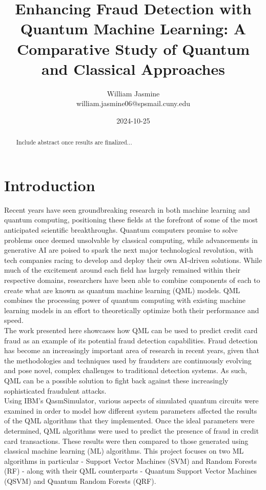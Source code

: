 \documentclass[11pt, oneside]{article}   	%
\title{Enhancing Fraud Detection with Quantum Machine Learning: A Comparative Study of Quantum and Classical Approaches}
\author{William Jasmine \\william.jasmine06@spsmail.cuny.edu}
\date{2024-10-25}							%
\begin{document}
\maketitle

\begin{abstract}
Include abstract once results are finalized...
\end{abstract}

\section{Introduction}

\hspace{10mm}Recent years have seen groundbreaking research in both machine learning and quantum computing, positioning these fields at the forefront of some of the most anticipated scientific breakthroughs. Quantum computers promise to solve problems once deemed unsolvable by classical computing, while advancements in generative AI are poised to spark the next major technological revolution, with tech companies racing to develop and deploy their own AI-driven solutions. While much of the excitement around each field has largely remained within their respective domains, researchers have been able to combine components of each to create what are known as quantum machine learning (QML) models. QML combines the processing power of quantum computing with existing machine learning models in an effort to theoretically optimize both their performance and speed.\\

\noindent\hspace{10mm}The work presented here showcases how QML can be used to predict credit card fraud as an example of its potential fraud detection capabilities. Fraud detection has become an increasingly important area of research in recent years, given that the methodologies and techniques used by fraudsters are continuously evolving and pose novel, complex challenges to traditional detection systems. As such, QML can be a possible solution to fight back against these increasingly sophisticated fraudulent attacks. \\

\noindent\hspace{10mm}Using IBM’s QasmSimulator, various aspects of simulated quantum circuits were examined in order to model how different system parameters affected the results of the QML algorithms that they implemented. Once the ideal parameters were determined, QML algorithms were used to predict the presence of fraud in credit card transactions. These results were then compared to those generated using classical machine learning (ML) algorithms. This project focuses on two ML algorithms in particular - Support Vector Machines (SVM) and Random Forests (RF) - along with their QML counterparts - Quantum Support Vector Machines (QSVM) and Quantum Random Forests (QRF). 
\end{document}
